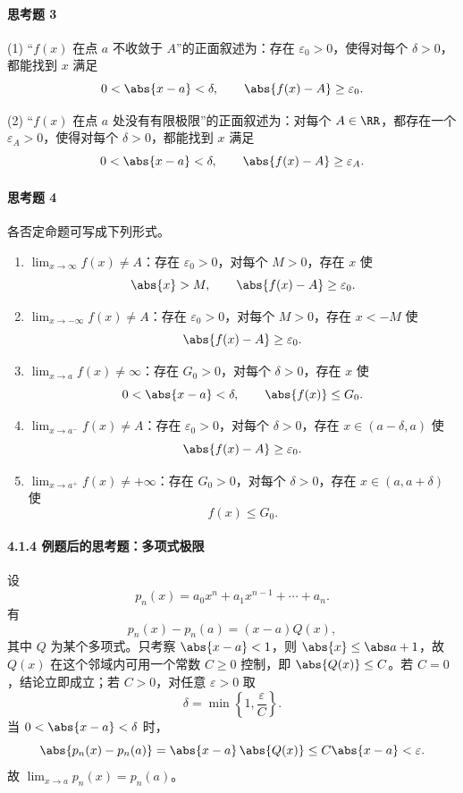 \paragraph{思考题 3}
\begin{xsolution}
(1) “$f(x)$ 在点 $a$ 不收敛于 $A$”的正面叙述为：存在 $\varepsilon_0>0$，使得对每个 $\delta>0$，都能找到 $x$ 满足
\[
  0<\abs{x-a}<\delta,\qquad \abs{f(x)-A}\geq\varepsilon_0.
\]

(2) “$f(x)$ 在点 $a$ 处没有有限极限”的正面叙述为：对每个 $A\in\RR$，都存在一个 $\varepsilon_A>0$，使得对每个 $\delta>0$，都能找到 $x$ 满足
\[
  0<\abs{x-a}<\delta,\qquad \abs{f(x)-A}\geq\varepsilon_A.
\]
\end{xsolution}

\paragraph{思考题 4}
\begin{xsolution}
各否定命题可写成下列形式。
\begin{enumerate}[label=(\arabic*)]
  \item $\displaystyle\lim_{x\to\infty}f(x)\ne A$：存在 $\varepsilon_0>0$，对每个 $M>0$，存在 $x$ 使
  \[
    \abs{x}>M,\qquad \abs{f(x)-A}\geq\varepsilon_0.
  \]
  \item $\displaystyle\lim_{x\to-\infty}f(x)\ne A$：存在 $\varepsilon_0>0$，对每个 $M>0$，存在 $x<-M$ 使
  \[
    \abs{f(x)-A}\geq\varepsilon_0.
  \]
  \item $\displaystyle\lim_{x\to a}f(x)\ne\infty$：存在 $G_0>0$，对每个 $\delta>0$，存在 $x$ 使
  \[
    0<\abs{x-a}<\delta,\qquad \abs{f(x)}\leq G_0.
  \]
  \item $\displaystyle\lim_{x\to a^-}f(x)\ne A$：存在 $\varepsilon_0>0$，对每个 $\delta>0$，存在
  $x\in(a-\delta,a)$ 使
  \[
    \abs{f(x)-A}\geq\varepsilon_0.
  \]
  \item $\displaystyle\lim_{x\to a^+}f(x)\ne+\infty$：存在 $G_0>0$，对每个 $\delta>0$，存在
  $x\in(a,a+\delta)$ 使
  \[
    f(x)\leq G_0.
  \]
\end{enumerate}
\end{xsolution}

\paragraph{4.1.4 例题后的思考题：多项式极限}
\begin{xsolution}
设
\[
  p_n(x)=a_0x^n+a_1x^{n-1}+\cdots+a_n.
\]
有
\[
  p_n(x)-p_n(a)=(x-a)Q(x),
\]
其中 $Q$ 为某个多项式。只考察 $\abs{x-a}<1$，则 $\abs{x}\leq\abs a+1$，故 $Q(x)$ 在这个邻域内可用一个常数 $C\geq0$ 控制，即 $\abs{Q(x)}\leq C$。若 $C=0$，结论立即成立；若 $C>0$，对任意 $\varepsilon>0$ 取
\[
  \delta=\min\left\{1,\frac\varepsilon C\right\}.
\]
当 $0<\abs{x-a}<\delta$ 时，
\[
  \abs{p_n(x)-p_n(a)}=\abs{x-a}\,\abs{Q(x)}
  \leq C\abs{x-a}<\varepsilon.
\]
故 $\lim_{x\to a}p_n(x)=p_n(a)$。
\end{xsolution}

